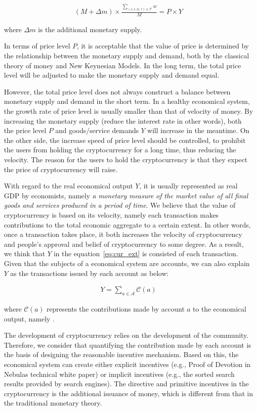 \begin{align}
(M + \Delta{m}) \times \frac{\sum_{(s, t, w, \tau)\in \mathcal{T}}{w}}{M} = P \times Y
\label{eq:cur_ext}
\end{align}

\noindent where $\Delta{m}$ is the additional monetary supply. 

In terms of price level $P$, it is acceptable that the value of price is determined by the relationship between the monetary supply and demand, both by the classical theory of money and New Keynesian Models. In the long term, the total price level will be adjusted to make the monetary supply and demand equal.

However, the total price level does not always construct a balance between monetary supply and demand in the short term. In a healthy economical system, the growth rate of price level is usually smaller than that of velocity of money. By increasing the monetary supply (reduce the interest rate in other words), both the price level $P$ and goods/service demands $Y$ will increase in the meantime. On the other side, the increase speed of price level should be controlled, to prohibit the users from holding the cryptocurrency for a long time, thus reducing the velocity. The reason for the users to hold the cryptocurrency is that they expect the price of cryptocurrency will raise.


With regard to the real economical output $Y$, it is usually represented as real GDP by economists, namely \emph{a monetary measure of the market value of all final goods and services produced in a period of time}. We believe that the value of cryptocurrency is based on its velocity, namely each transaction makes contributions to the total economic aggregate to a certain extent. In other words, once a transaction takes place, it both increases the velocity of cryptocurrency and people's approval and belief of cryptocurrency to some degree. As a result, we think that $Y$ in the equation~\ref{eq:cur_ext} is consisted of each transaction. Given that the subjects of a economical system are accounts, we can also explain $Y$ as the transactions issued by each account as below:

\begin{align}
Y=\sum_{a\in \mathcal{A}} \mathcal{C}(a)
\end{align}

\noindent where $\mathcal{C}(a)$ represents the contributions made by account $a$ to the economical output, namely \nrcore.

The development of cryptocurrency relies on the development of the community. Therefore, we consider that quantifying the contribution made by each account is the basis of designing the reasonable incentive mechanism. Based on this, the economical system can create either explicit incentives (e.g., Proof of Devotion in Nebulas technical white paper) or implicit incentives (e.g., the sorted search results provided by search engines). 
The directive and primitive incentives in the cryptocurrency is the additional issuance of money, which is different from that in the traditional monetary theory.